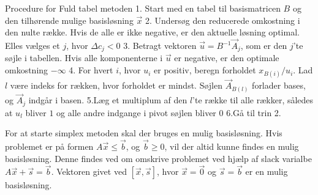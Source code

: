 \begin{pro} [label=pro:simplex,numbers=none,xleftmargin=0em] {Procedure for Fuld tabel metoden}
1. Start med en tabel til basismatricen $B$ og den tilhørende mulige basisløsning $\vec{x}$
2. Undersøg den reducerede omkostning i den nulte række. Hvis de alle er ikke negative, er den aktuelle løsning optimal. Elles vælges et $j$, hvor $\Delta c_j <0$
3. Betragt vektoren $\vec{u}=B^{-1}\vec{A}_j$, som er den $j$'te søjle i tabellen. Hvis alle komponenterne i $\vec{u}$ er negative, er den optimale omkostning $-\infty$
4. For hvert $i$, hvor $u_i$ er positiv, beregn forholdet $x_{B(i)}/u_i$. Lad $l$ være indeks for rækken, hvor forholdet er mindst. Søjlen $\vec{A}_{B(l)}$ forlader bases, og $\vec{A}_j$ indgår i basen. 
5.Læg et multiplum af den $l$'te række til alle rækker, således at $u_l$ bliver $1$ og alle andre indgange i pivot søjlen bliver $0$
6.Gå til trin 2. 
\end{pro}
For at starte simplex metoden skal der bruges en mulig basisløsning. Hvis problemet er på formen $A\vec{x} \leq \vec{b}$, og $\vec{b} \geq 0$, vil der altid kunne findes en mulig basisløsning. Denne findes ved om omskrive problemet ved hjælp af slack varialbe $A\vec{x} +\vec{s}= \vec{b}$. Vektoren givet ved $[\vec{x},\vec{s}]$, hvor $\vec{x}=\vec{0}$ og $\vec{s}=\vec{b}$ er en mulig basisløsning. 
